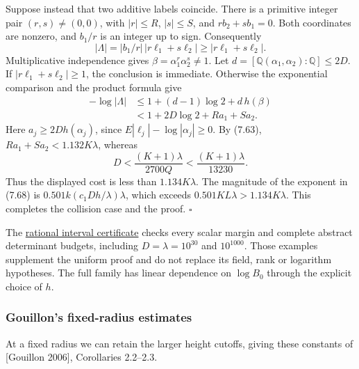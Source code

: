 \documentclass[
  11pt,
  a4paper,
]{article}
\begin{document}
Suppose instead that two additive labels coincide. There is a primitive
integer pair \((r,s)\ne(0,0)\), with \(|r|\le R\), \(|s|\le S\), and
\(rb_2+sb_1=0\). Both coordinates are nonzero, and \(b_1/r\) is an
integer up to sign. Consequently \[
|\Lambda|=|b_1/r|\,|r\ell_1+s\ell_2|
\ge|r\ell_1+s\ell_2|.
\] Multiplicative independence gives \(\beta=\alpha_1^r\alpha_2^s\ne1\).
Let \(d=[\mathbb Q(\alpha_1,\alpha_2):\mathbb Q]\le2D\). If
\(|r\ell_1+s\ell_2|\ge1\), the conclusion is immediate. Otherwise the
exponential comparison and the product formula give \[
\begin{aligned}
-\log|\Lambda|
&\le1+(d-1)\log2+d\,h(\beta)\\
&<1+2D\log2+Ra_1+Sa_2.
\end{aligned}
\] Here \(a_j\ge2Dh(\alpha_j)\), since \(E|\ell_j|-\log|\alpha_j|\ge0\).
By (7.63), \(Ra_1+Sa_2<1.132K\lambda\), whereas \[
D<\frac{(K+1)\lambda}{2700Q}
<\frac{(K+1)\lambda}{13230}.
\] Thus the displayed cost is less than \(1.134K\lambda\). The magnitude
of the exponent in (7.68) is \(0.501k(c_1Dh/\lambda)\lambda\), which
exceeds \(0.501KL\lambda>1.134K\lambda\). This completes the collision
case and the proof. \(\square\)

The \href{https://kokunoyumeto.github.io/open-math-courses-public/courses/TR-BAKER/verification/gouillon_final_budget.py}{rational interval
certificate} checks every scalar margin and complete abstract
determinant budgets, including \(D=\lambda=10^{30}\) and \(10^{1000}\).
Those examples supplement the uniform proof and do not replace its
field, rank or logarithm hypotheses. The full family has linear
dependence on \(\log B_0\) through the explicit choice of \(h\).

\subsubsection{Gouillon's fixed-radius
estimates}\label{gouillons-fixed-radius-estimates}

At a fixed radius we can retain the larger height cutoffs, giving these
constants of {[}Gouillon 2006{]}, Corollaries 2.2--2.3.
\end{document}
